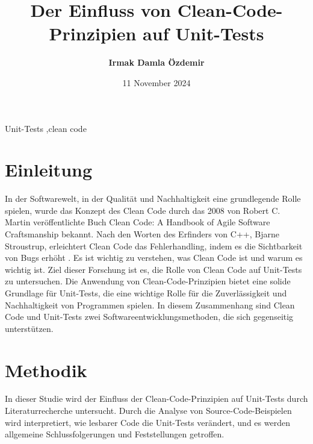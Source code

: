 \documentclass[12pt, parskip]{elsarticle}
\begin{document}
\begin{frontmatter}

\title{\textbf{Der Einfluss von Clean-Code-Prinzipien auf Unit-Tests}}
\date{11 November 2024}

\author{\textbf{Irmak Damla Özdemir}}


\address{\textbf{Fachbereich Informatik, Technische Hochschule Würzburg-Schweinfurt}}
\address{\textbf{Sanderheinrichsleitenweg 20, 97074, Würzburg, Germany}}
\address{\textbf{irmakdamla.oezdemir@study.thws.de}}


\begin{keyword}
Unit-Tests \sep clean code 
\end{keyword}

\end{frontmatter}

\section{Einleitung}
\label{sec:sample1}
\setlength{\parindent}{0pt}
In der Softwarewelt, in der Qualität und Nachhaltigkeit eine grundlegende Rolle spielen, wurde das Konzept des Clean Code durch das 2008 von Robert C. Martin veröffentlichte Buch Clean Code: A Handbook of Agile Software Craftsmanship bekannt. Nach den Worten des Erfinders von C++, Bjarne Stroustrup, erleichtert Clean Code das Fehlerhandling, indem es die Sichtbarkeit von Bugs erhöht \cite{martin2009clean}. Es ist wichtig zu verstehen, was Clean Code ist und warum es wichtig ist. Ziel dieser Forschung ist es, die Rolle von Clean Code auf Unit-Tests zu untersuchen. Die Anwendung von Clean-Code-Prinzipien bietet eine solide Grundlage für Unit-Tests, die eine wichtige Rolle für die Zuverlässigkeit und Nachhaltigkeit von Programmen spielen. In diesem Zusammenhang sind Clean Code und Unit-Tests zwei Softwareentwicklungsmethoden, die sich gegenseitig unterstützen.


\section{Methodik}
\label{sec:another}
\setlength{\parindent}{0pt}
In dieser Studie wird der Einfluss der Clean-Code-Prinzipien auf Unit-Tests durch Literaturrecherche untersucht. Durch die Analyse von Source-Code-Beispielen wird interpretiert, wie lesbarer Code die Unit-Tests verändert, und es werden allgemeine Schlussfolgerungen und Feststellungen getroffen.
\end{document}
